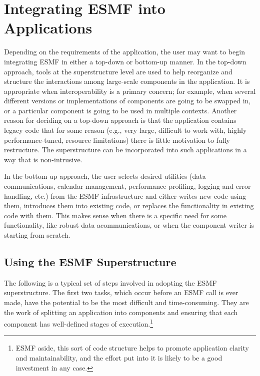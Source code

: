 \section{Integrating ESMF into Applications}

Depending on the requirements of the application, the user may 
want to begin integrating ESMF in either a top-down or bottom-up 
manner.  In the top-down approach, tools at the superstructure 
level are used to help reorganize and structure the interactions
among large-scale components in the application.  It is appropriate
when interoperability is a primary concern; for example, when 
several different versions or implementations of components are going 
to be swapped in, or a particular component is going to be used 
in multiple contexts.  Another reason for deciding on a top-down 
approach is that the application contains legacy code that for 
some reason (e.g., very large, difficult to work with, 
highly performance-tuned, resource limitations) there is little 
motivation to fully restructure.  The superstructure can be 
incorporated into such applications in a way that is non-intrusive.

In the bottom-up approach, the user selects desired utilities 
(data communications, calendar management, performance profiling,
logging and error handling, etc.) from the ESMF infrastructure 
and either writes new code using them, introduces them into 
existing code, or replaces the functionality in existing code 
with them.  This makes sense when there is a specific need for 
some functionality, like robust data acommunications, or 
when the component writer is starting from scratch.

\subsection{Using the ESMF Superstructure}

The following is a typical set of steps involved in adopting
the ESMF superstructure.  The first two tasks, which occur 
before an ESMF call is ever made, have the potential to be 
the most difficult and time-consuming.  They are the work 
of splitting an application into components and ensuring that
each component has well-defined stages of execution.\footnote{ESMF
aside, this sort of code structure helps to promote application
clarity and maintainability, and the effort put into it is likely
to be a good investment in any case.}

